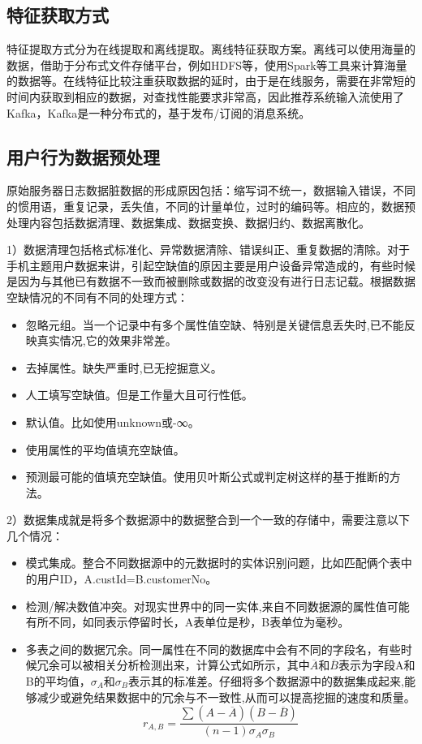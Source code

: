  \subsection{特征获取方式}
  特征提取方式分为在线提取和离线提取。离线特征获取方案。离线可以使用海量的数据，借助于分布式文件存储平台，例如HDFS等，使用Spark等工具来计算海量的数据等。在线特征比较注重获取数据的延时，由于是在线服务，需要在非常短的时间内获取到相应的数据，对查找性能要求非常高，因此推荐系统输入流使用了Kafka，Kafka是一种分布式的，基于发布/订阅的消息系统。

  \subsection{用户行为数据预处理}
  原始服务器日志数据脏数据的形成原因包括：缩写词不统一，数据输入错误，不同的惯用语，重复记录，丢失值，不同的计量单位，过时的编码等。相应的，数据预处理内容包括数据清理、数据集成、数据变换、数据归约、数据离散化。

  1）数据清理包括格式标准化、异常数据清除、错误纠正、重复数据的清除。对于手机主题用户数据来讲，引起空缺值的原因主要是用户设备异常造成的，有些时候是因为与其他已有数据不一致而被删除或数据的改变没有进行日志记载。根据数据空缺情况的不同有不同的处理方式：
  \begin{itemize}
  \item 忽略元组。当一个记录中有多个属性值空缺、特别是关键信息丢失时,已不能反映真实情况,它的效果非常差。
  \item 去掉属性。缺失严重时,已无挖掘意义。
  \item 人工填写空缺值。但是工作量大且可行性低。
  \item 默认值。比如使用unknown或-∞。
  \item 使用属性的平均值填充空缺值。
  \item 预测最可能的值填充空缺值。使用贝叶斯公式或判定树这样的基于推断的方法。
  \end{itemize}

  2）数据集成就是将多个数据源中的数据整合到一个一致的存储中，需要注意以下几个情况：
  \begin{itemize}
  \item 模式集成。整合不同数据源中的元数据时的实体识别问题，比如匹配俩个表中的用户ID，A.custId=B.customerNo。
  \item 检测/解决数值冲突。对现实世界中的同一实体,来自不同数据源的属性值可能有所不同，如同表示停留时长，A表单位是秒，B表单位为毫秒。
  \item 多表之间的数据冗余。同一属性在不同的数据库中会有不同的字段名，有些时候冗余可以被相关分析检测出来，计算公式如所示，其中$\overline{A}$和$\overline{B}$表示为字段A和B的平均值，$\sigma_A和\sigma_B$表示其的标准差。仔细将多个数据源中的数据集成起来,能够减少或避免结果数据中的冗余与不一致性,从而可以提高挖掘的速度和质量。
  \begin{equation}
    r_{A,B} = \frac{\sum (A-\overline{A})(B-\overline{B})}{(n-1)\sigma_A\sigma_B}
    \label{F-Measure}
  \end{equation}
  \end{itemize}

